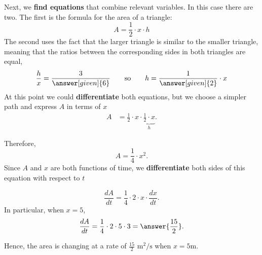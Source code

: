\documentclass{ximera}
\begin{document}
\begin{example}
\begin{explanation}
    Next, we \textbf{find equations} that combine relevant
    variables. In this case there are two. The first is the formula
    for the area of a triangle:
    \[
    A = \frac{1}{2} \cdot x \cdot h
    \]
    The second uses the fact that the larger triangle is similar to
    the smaller triangle, meaning that the ratios between the corresponding sides in both triangles
    are equal,
    \[
    \frac{h}{x} = \frac{3}{\answer[given]{6}}\qquad\text{so}\qquad h =
    \frac{1}{\answer[given]{2}}\cdot x
    \]
   At this point we could \textbf{differentiate} both equations, but we 
    choose a simpler path and express  $A$ in terms of $x$  
     \begin{align*}
    A& = \frac{1}{2} \cdot x\cdot\underbrace{ \frac{1}{2}\cdot x}_{h} .
     \end{align*}
     
     Therefore,
     \[
     A=\frac{1}{4}\cdot x^2.
     \]
       Since $A$ and $x$ are both functions of time, we \textbf{differentiate} both sides of this equation with respect to $t$
       
        \[
     \frac{dA}{dt}=\frac{1}{4}\cdot2\cdot x\cdot\frac{dx}{dt}.
     \]
In particular, when $x=5$, 
      \[
   \frac{dA}{dt}=\frac{1}{4}\cdot2\cdot 5\cdot 3=\answer{\frac{15}{2}}.
     \]
  
    Hence, the area is changing at a rate of $ \frac{15}{2}$ $\text{m}^2/\text{s}$ when $x=5$m.
    
  \end{explanation}
\end{example}
\end{document}
